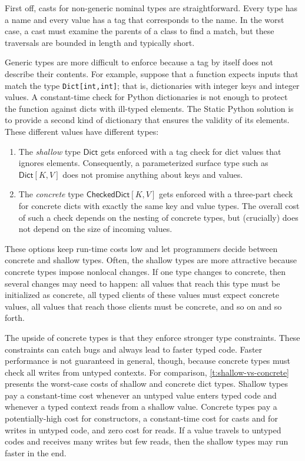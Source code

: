 \documentclass[english,cleveref,submission]{programming}
\newcommand{\SP}{Static Python}
\newcommand{\code}[1]{\texttt{#1}}
\newcommand{\typefont}[1]{\mathsf{#1}}
\newcommand{\paramtype}[2]{#1[#2]}
\newcommand{\sptrawpydict}{\typefont{Dict}}
\newcommand{\sptrawchkdict}{\typefont{CheckedDict}} %
\newcommand{\sptpydict}[2]{\paramtype{\sptrawpydict}{#1, #2}}
\newcommand{\sptchkdict}[2]{\paramtype{\sptrawchkdict}{#1, #2}}
\begin{document}
First off, casts for non-generic nominal types are straightforward.
Every type has a name and every value has a tag that corresponds to the name.
In the worst case, a cast must examine the parents of a class to find a match,
but these traversals are bounded in length and typically short.

Generic types are more difficult to enforce because a tag by itself does not
describe their contents.
For example, suppose that a function expects inputs that match
the type \code{Dict[int,int]}; that is, dictionaries with integer keys and
integer values.
A constant-time check for Python dictionaries is not enough to protect the
function against dicts with ill-typed elements.
The \SP{} solution is to provide a second kind of dictionary that ensures
the validity of its elements.
These different values have different types:
\begin{enumerate}
  \item
    The \emph{shallow} type $\sptrawpydict$ gets enforced with a tag check
    for dict values that ignores elements.
    Consequently, a parameterized surface type such as $\sptpydict{K}{V}$
    does not promise anything about keys and values.
  \item
    The \emph{concrete} type $\sptchkdict{K}{V}$ gets enforced with a
    three-part check for concrete dicts with exactly the same key and value
    types.
    The overall cost of such a check depends on the nesting of concrete types,
    but (crucially) does not depend on the size of incoming values.
\end{enumerate}
%
These options keep run-time costs low and let programmers decide between
concrete and shallow types.
Often, the shallow types are more attractive because concrete types impose
nonlocal changes.
If one type changes to concrete, then several changes may need to happen:
all values that reach this type must be initialized as concrete,
all typed clients of these values must expect concrete values,
all values that reach those clients must be concrete,
and so on and so forth.

The upside of concrete types is that they enforce stronger type constraints.
These constraints can catch bugs and always lead to faster typed code.
Faster performance is not guaranteed in general, though, because concrete types must
check all writes from untyped contexts.
For comparison, \cref{t:shallow-vs-concrete} presents the worst-case costs of
shallow and concrete dict types.
Shallow types pay a constant-time cost whenever an untyped value enters typed code
and whenever a typed context reads from a shallow value.
Concrete types pay a potentially-high cost for constructors,
a constant-time cost for casts and for writes in untyped code,
and zero cost for reads.
If a value travels to untyped codes and receives many writes but few reads,
then the shallow types may run faster in the end.
\end{document}
